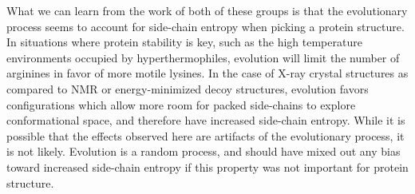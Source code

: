What we can learn from the work of both of these groups is that the evolutionary process seems to account for side-chain entropy when picking a protein structure. In situations where protein stability is key, such as the high temperature environments occupied by hyperthermophiles, evolution will limit the number of arginines in favor of more motile lysines. In the case of X-ray crystal structures as compared to NMR or energy-minimized decoy structures, evolution favors configurations which allow more room for packed side-chains to explore conformational space, and therefore have increased side-chain entropy. While it is possible that the effects observed here are artifacts of the evolutionary process, it is not likely. Evolution is a random process, and should have mixed out any bias toward increased side-chain entropy if this property was not important for protein structure.